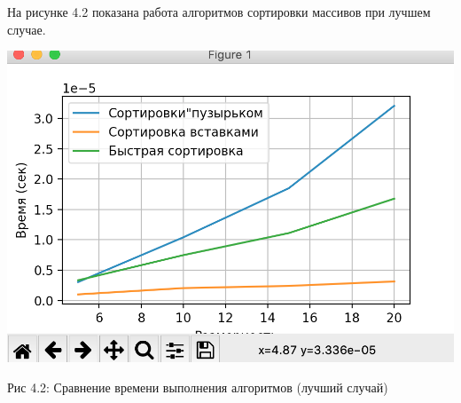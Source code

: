 \documentclass[12pt]{report}
\begin{document}
На рисунке 4.2 показана работа алгоритмов сортировки массивов при лучшем случае.


\begin{center}
		\includegraphics[scale=0.6]{Best.png}
		
			Рис 4.2: Сравнение времени выполнения алгоритмов (лучший случай)
\end{center}
\end{document}
